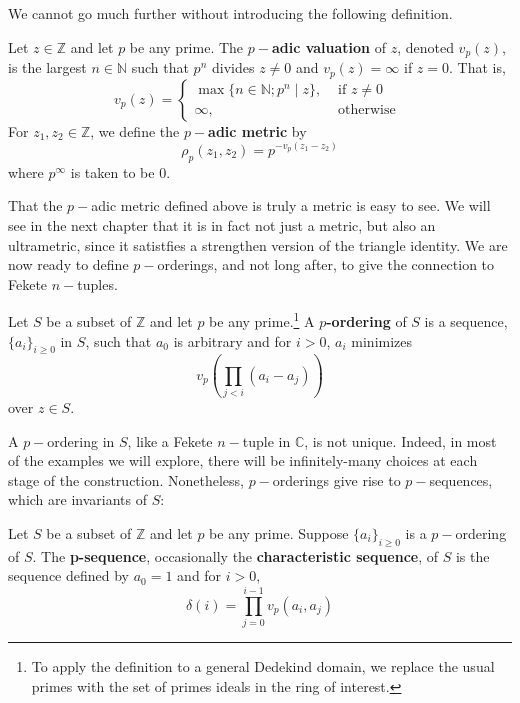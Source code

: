 We cannot go much further without introducing the following definition. 

\begin{definition}
Let $z \in \mathbb{Z}$ and let $p$ be any prime. The \textbf{$p-$adic valuation} of $z$, denoted $v_p(z)$, is the largest $n \in \mathbb{N}$ such that $p^n$ divides $z \neq 0$ and $v_p(z) = \infty$ if $z=0$. That is,
\[
v_p(z) = 
\begin{cases}
 \max\{n \in \mathbb{N}; p^n \mid z\}, & \text{ if } z \neq 0 \\
         \infty, & \text{ otherwise }
\end{cases}
\]
For $z_1,z_2 \in \mathbb{Z}$,  we define the \textbf{$p-$adic metric} by 
\[\rho_p(z_1,z_2) = p^{-v_p(z_1-z_2)}\]
where $p^\infty$ is taken to be $0$. 
\end{definition}

That the $p-$adic metric defined above is truly a metric is easy to see. We will see in the next chapter that it is in fact not just a metric, but also an ultrametric, since it satistfies a strengthen version of the triangle identity. We are now ready to define $p-$orderings, and not long after, to give the connection to Fekete $n-$tuples.

\begin{definition}
\cite{mb1} Let $S$ be a subset of $\mathbb{Z}$  and let $p$ be any prime.\footnote{To apply the definition to a general Dedekind domain, we replace the usual primes with the set of primes ideals in the ring of interest.} A \textbf{$p$-ordering} of $S$ is a sequence, $\{a_i\}_{i\geq 0}$ in $S$, such that $a_0$ is arbitrary and for $i >0$, $a_i$ minimizes 
\[ v_p (\prod_{j < i} (a_i - a_j) )\] over $z \in S$.
\end{definition}


A $p-$ordering in $S$, like a Fekete $n-$tuple in $\mathbb{C}$, is not unique. Indeed, in most of the examples we will explore, there will be infinitely-many choices at each stage of the construction. Nonetheless, $p-$orderings give rise to $p-$sequences, which are invariants of $S$:\\

\begin{definition}
\cite{mb1} Let $S$ be a subset of $\mathbb{Z}$ and let $p$ be any prime. Suppose $\{a_i\}_{i\geq 0}$ is a $p-$ordering of $S$. The \textbf{p-sequence}, occasionally the \textbf{characteristic sequence}, of $S$ is the sequence defined by $a_0=1$ and for $i > 0,$\[\delta(i) = \prod_{j=0}^{i-1} v_p(a_i, a_j)\]
\end{definition}

